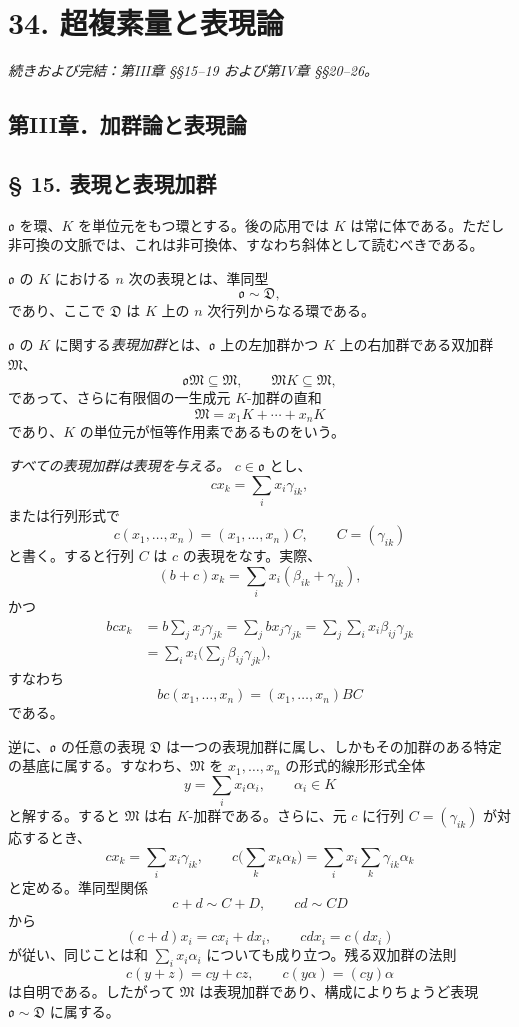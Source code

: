 \documentclass[11pt]{article}
\providecommand{\mM}{\mathfrak{M}}
\providecommand{\mo}{\mathfrak{o}}
\begin{document}
\setcounter{footnote}{0}
\section*{34. 超複素量と表現論}
\emph{続きおよび完結：第III章 §§15--19 および第IV章 §§20--26。}

\subsection*{第III章．加群論と表現論}

\subsection*{§ 15. 表現と表現加群}

$\mo$ を環、$K$ を単位元をもつ環とする。後の応用では $K$ は常に体である。ただし非可換の文脈では、これは非可換体、すなわち斜体として読むべきである。

$\mo$ の $K$ における $n$ 次の表現とは、準同型
\[
        \mo \sim \mathfrak D,
\]
であり、ここで $\mathfrak D$ は $K$ 上の $n$ 次行列からなる環である。

$\mo$ の $K$ に関する\emph{表現加群}とは、$\mo$ 上の左加群かつ $K$ 上の右加群である双加群 $\mM$、
\[
        \mo\mM\subseteq \mM,
        \qquad
        \mM K\subseteq \mM,
\]
であって、さらに有限個の一生成元 $K$-加群の直和
\[
        \mM=x_1K+\cdots+x_nK
\]
であり、$K$ の単位元が恒等作用素であるものをいう。

\emph{すべての表現加群は表現を与える。} $c\in\mo$ とし、
\[
        cx_k=\sum_i x_i\gamma_{ik},
\]
または行列形式で
\[
        c(x_1,\ldots,x_n)=(x_1,\ldots,x_n)C,
        \qquad C=(\gamma_{ik})
\]
と書く。すると行列 $C$ は $c$ の表現をなす。実際、
\[
        (b+c)x_k=\sum_i x_i(\beta_{ik}+\gamma_{ik}),
\]
かつ
\[
\begin{aligned}
        bcx_k
        &=b\sum_jx_j\gamma_{jk}
          =\sum_j b x_j\gamma_{jk}
          =\sum_j\sum_i x_i\beta_{ij}\gamma_{jk}       \\
        &=\sum_i x_i\biggl(\sum_j\beta_{ij}\gamma_{jk}\biggr),
\end{aligned}
\]
すなわち
\[
        bc(x_1,\ldots,x_n)=(x_1,\ldots,x_n)BC
\]
である。

逆に、$\mo$ の任意の表現 $\mathfrak D$ は一つの表現加群に属し、しかもその加群のある特定の基底に属する。すなわち、$\mM$ を $x_1,\ldots,x_n$ の形式的線形形式全体
\[
        y=\sum_i x_i\alpha_i,
        \qquad \alpha_i\in K
\]
と解する。すると $\mM$ は右 $K$-加群である。さらに、元 $c$ に行列 $C=(\gamma_{ik})$ が対応するとき、
\[
        cx_k=\sum_i x_i\gamma_{ik},
        \qquad
        c\biggl(\sum_k x_k\alpha_k\biggr)
        =\sum_i x_i\sum_k\gamma_{ik}\alpha_k
\]
と定める。準同型関係
\[
        c+d\sim C+D,
        \qquad
        cd\sim CD
\]
から
\[
        (c+d)x_i=cx_i+dx_i,
        \qquad
        cdx_i=c(dx_i)
\]
が従い、同じことは和 $\sum_i x_i\alpha_i$ についても成り立つ。残る双加群の法則
\[
        c(y+z)=cy+cz,
        \qquad
        c(y\alpha)=(cy)\alpha
\]
は自明である。したがって $\mM$ は表現加群であり、構成によりちょうど表現 $\mo\sim\mathfrak D$ に属する。
\end{document}
